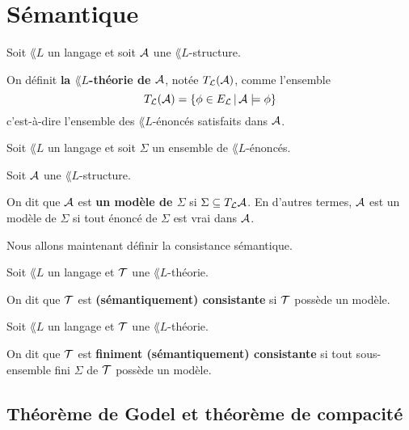 \documentclass[a4paper, 12pt]{report}
\begin{document}
\section{Sémantique}

\begin{definition} 
	Soit $\lang{L}$ un langage et soit $\mathcal{A}$ une $\lang{L}$-structure.

	On définit \textbf{la $\lang{L}$-théorie de $\mathcal{A}$}, notée
	$T_{\mathcal{L}}(\mathcal{A})$, comme l'ensemble
	\begin{equation}
		T_{\mathcal{L}}(\mathcal{A}) = \left\{\phi \in E_{\mathcal{L}} \, | \, \mathcal{A}
	\models \phi \right\}
	\end{equation}
	c'est-à-dire l'ensemble des $\lang{L}$-énoncés satisfaits dans $\mathcal{A}$.
\end{definition}

\begin{definition} [Modèle]
	Soit $\lang{L}$ un langage et soit $\Sigma$ un ensemble de $\lang{L}$-énoncés.

	Soit $\mathcal{A}$ une $\lang{L}$-structure.

	On dit que $\mathcal{A}$ est \textbf{un modèle de $\Sigma$} si $\Sigma
	\subseteq T_{\mathcal{L}}{\mathcal{A}}$. En d'autres termes, $\mathcal{A}$ est un
	modèle de $\Sigma$ si tout énoncé de $\Sigma$ est vrai dans $\mathcal{A}$.
\end{definition}

Nous allons maintenant définir la consistance sémantique.

\begin{definition} 
	Soit $\lang{L}$ un langage et $\mathcal{T}$ une $\lang{L}$-théorie.

	On dit que $\mathcal{T}$ est \textbf{(sémantiquement) consistante} si
	$\mathcal{T}$ possède un modèle.
\end{definition}

\begin{definition} 
	Soit $\lang{L}$ un langage et $\mathcal{T}$ une $\lang{L}$-théorie.

	On dit que $\mathcal{T}$ est \textbf{finiment (sémantiquement) consistante} si
	tout sous-ensemble fini $\Sigma$ de $\mathcal{T}$ possède un modèle.
\end{definition}

\subsection{Théorème de Godel et théorème de compacité}
\end{document}
